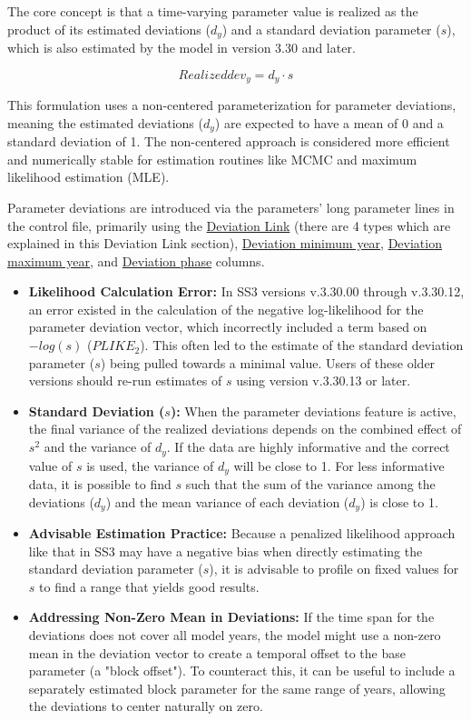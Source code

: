 The core concept is that a time-varying parameter value is realized as the product of its estimated deviations ($d_y$) and a standard deviation parameter ($s$), which is also estimated by the model in version 3.30 and later.

\begin{equation}
Realized dev_y = d_y \cdot s
\end{equation}

This formulation uses a non-centered parameterization for parameter deviations, meaning the estimated deviations ($d_y$) are expected to have a mean of 0 and a standard deviation of 1. The non-centered approach is considered more efficient and numerically stable for estimation routines like MCMC and maximum likelihood estimation (MLE).

Parameter deviations are introduced via the parameters' long parameter lines in the control file, primarily using the \hyperlink{DevLink}{Deviation Link} (there are 4 types which are explained in this Deviation Link section), \hyperlink{DevMinYr}{Deviation minimum year}, \hyperlink{DevMaxYr}{Deviation maximum year}, and \hyperlink{DevPhase}{Deviation phase} columns.


\begin{itemize}
	\item \textbf{Likelihood Calculation Error:} In SS3 versions v.3.30.00 through v.3.30.12, an error existed in the calculation of the negative log-likelihood for the parameter deviation vector, which incorrectly included a term based on $-log(s)$ ($PLIKE_2$). This often led to the estimate of the standard deviation parameter ($s$) being pulled towards a minimal value. Users of these older versions should re-run estimates of $s$ using version v.3.30.13 or later.
	\item \textbf{Standard Deviation ($s$):} When the parameter deviations feature is active, the final variance of the realized deviations depends on the combined effect of $s^2$ and the variance of $d_y$. If the data are highly informative and the correct value of $s$ is used, the variance of $d_y$ will be close to 1. For less informative data, it is possible to find $s$ such that the sum of the variance among the deviations ($d_y$) and the mean variance of each deviation ($d_y$) is close to 1.
	\item \textbf{Advisable Estimation Practice:} Because a penalized likelihood approach like that in SS3 may have a negative bias when directly estimating the standard deviation parameter ($s$), it is advisable to profile on fixed values for $s$ to find a range that yields good results.
	\item \textbf{Addressing Non-Zero Mean in Deviations:} If the time span for the deviations does not cover all model years, the model might use a non-zero mean in the deviation vector to create a temporal offset to the base parameter (a "block offset"). To counteract this, it can be useful to include a separately estimated block parameter for the same range of years, allowing the deviations to center naturally on zero.
\end{itemize}

